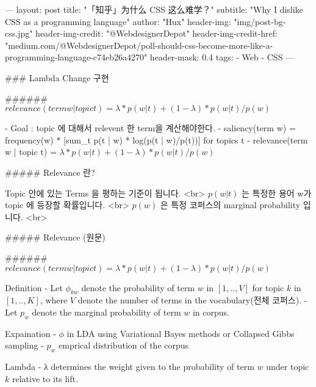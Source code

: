 ---
layout: post
title: "「知乎」为什么 CSS 这么难学？"
subtitle: "Why I dislike CSS as a programming language"
author: "Hux"
header-img: "img/post-bg-css.jpg"
header-img-credit: "@WebdesignerDepot"
header-img-credit-href: "medium.com/@WebdesignerDepot/poll-should-css-become-more-like-a-programming-language-c74eb26a4270"
header-mask: 0.4
tags:
  - Web
  - CSS
---



### Lambda Change 구현

###### $relevance(term w | topic t) = λ * p(w | t) + (1 - λ) * p(w | t)/p(w)$


- Goal : topic 에 대해서 relevent 한 term을 계산해야한다.
- saliency(term w) = frequency(w) * [sum_t p(t | w) * log(p(t | w)/p(t))] for topics t
- relevance(term w | topic t) = $λ * p(w | t) + (1 - λ) * p(w | t)/p(w)$

##### Relevance 란?

Topic 안에 있는 Terms 을 평하는 기준이 됩니다. <br>
$p(w|t)$ 는 특정한 용어 w가 topic 에 등장할 확률입니다. <br>
$p(w)$ 은 특정 코퍼스의 marginal probability 입니다. <br>


##### Relevance (원문)

###### $relevance(term w | topic t) = λ * p(w | t) + (1 - λ) * p(w | t)/p(w)$


Definition
 - Let $\phi_{kw}$ denote the probability of term $w$ in $[1,..,V]$ for topic $k$ in $[1,..,K]$, where $V$ denote the number of terms in the vocabulary(전체 코퍼스).
 - Let $p_{w}$ denote the marginal probability of term $w$ in corpus.

Expaination
 - $\phi$ in LDA using Variational Bayes methods or Collapsed Gibbs sampling
 - $p_{w}$ emprical distribution of the corpus

Lambda
 - λ determines the weight given to the probability of term $w$ under topic $k$ relative to its lift.